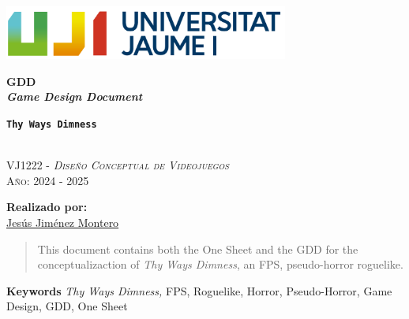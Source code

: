 \documentclass[12pt]{article}
\newcommand{\gameTitle}{\texttt{\textbf{Thy Ways Dimness}}\xspace}
\begin{document}
\pagecolor{pageColor}
\color{textColor}
\begin{titlepage}
    \vspace*{\fill}

    \centering
    \parbox{0.8\textwidth}{    %
        \includegraphics[width=0.7\textwidth]{Imagenes/marca-uji-color-fons-transparent.png}\par\vspace{1cm}

        {\Huge \bfseries GDD \\ \textit{Game Design Document} \par}
        {\Large \bfseries \gameTitle \par}

        \textsc{\large }
        \vspace{0.5cm} \\
        \textsc{\Large VJ1222 - \textit{Diseño Conceptual de Videojuegos}}
        \vspace{0.5cm} \\
        \textsc{\large Año: 2024 - 2025}
        \vfill

        \textbf{Realizado por:}         \\
        \href{https://www.richardotomislav.com/}{Jesús Jiménez Montero}      \\
    }
    \vspace*{\fill}
\end{titlepage}

\begin{abstract}
    This document contains both the One Sheet and the GDD for the conceptualizaction of \textit{Thy Ways Dimness}, an FPS, pseudo-horror roguelike.
\end{abstract}
{\small \textbf{Keywords} \textit{Thy Ways Dimness,} FPS, Roguelike, Horror, Pseudo-Horror, Game Design, GDD, One Sheet}
\newpage

\hypertarget{toc}{}

\tableofcontents

\newpage
\end{document}
